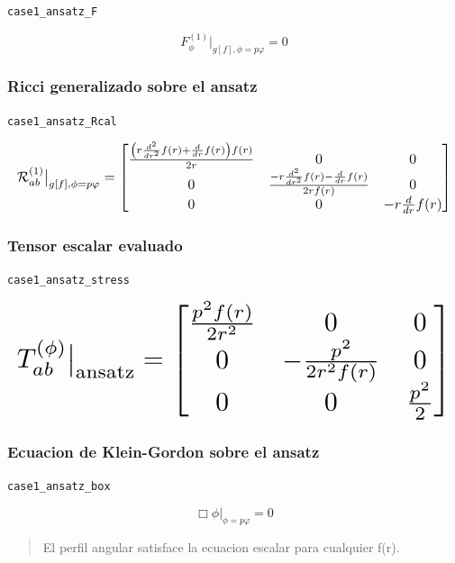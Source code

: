 \documentclass[11pt,a4paper]{article}
\begin{document}
\noindent\texttt{case1\_ansatz\_F}\par\nopagebreak[4]

\[
F_\phi^{(1)}\big|_{g[f],\phi=p\varphi} = 0
\]

\subsubsection{Ricci generalizado sobre el ansatz}

\noindent\texttt{case1\_ansatz\_Rcal}\par\nopagebreak[4]

\[
\resizebox{\textwidth}{!}{$\displaystyle \mathcal R^{(1)}_{ab}\big|_{g[f],\phi=p\varphi} = \left[\begin{matrix}\frac{\left(r \frac{d^{2}}{d r^{2}} f{\left(r \right)} + \frac{d}{d r} f{\left(r \right)}\right) f{\left(r \right)}}{2 r} & 0 & 0\\0 & \frac{- r \frac{d^{2}}{d r^{2}} f{\left(r \right)} - \frac{d}{d r} f{\left(r \right)}}{2 r f{\left(r \right)}} & 0\\0 & 0 & - r \frac{d}{d r} f{\left(r \right)}\end{matrix}\right]$}
\]

\subsubsection{Tensor escalar evaluado}

\noindent\texttt{case1\_ansatz\_stress}\par\nopagebreak[4]

\[
\resizebox{\textwidth}{!}{$\displaystyle T^{(\phi)}_{ab}\big|_{\mathrm{ansatz}} = \left[\begin{matrix}\frac{p^{2} f{\left(r \right)}}{2 r^{2}} & 0 & 0\\0 & - \frac{p^{2}}{2 r^{2} f{\left(r \right)}} & 0\\0 & 0 & \frac{p^{2}}{2}\end{matrix}\right]$}
\]

\subsubsection{Ecuacion de Klein-Gordon sobre el ansatz}

\noindent\texttt{case1\_ansatz\_box}\par\nopagebreak[4]

\[
\Box\phi\big|_{\phi=p\varphi} = 0
\]

\begin{quote}\small El perfil angular satisface la ecuacion escalar para cualquier f(r).\end{quote}
\end{document}
